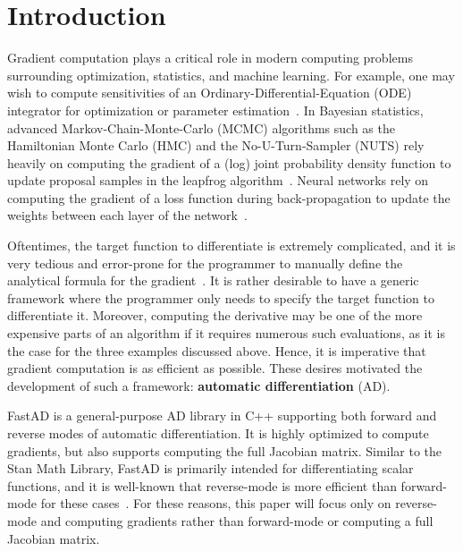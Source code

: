 \section{Introduction}

Gradient computation plays a critical role in modern computing problems 
surrounding optimization, statistics, and machine learning.
For example, one may wish to compute sensitivities of 
an Ordinary-Differential-Equation (ODE) integrator
for optimization or parameter estimation~\cite{carpenter:2015}.
In Bayesian statistics, advanced Markov-Chain-Monte-Carlo (MCMC) algorithms
such as the Hamiltonian Monte Carlo (HMC) and the No-U-Turn-Sampler (NUTS) rely
heavily on computing the gradient of a (log) joint probability density function
to update proposal samples in the leapfrog algorithm~\cite{hoffman:2011}\cite{neal:2012}.
Neural networks rely on computing 
the gradient of a loss function during back-propagation
to update the weights between each layer of the network~\cite{goodfellow:2016}.

Oftentimes, the target function to differentiate is extremely complicated,
and it is very tedious and error-prone for the programmer to manually define 
the analytical formula for the gradient~\cite{margossian:2018}.
It is rather desirable to have a generic framework where the programmer 
only needs to specify the target function to differentiate it.
Moreover, computing the derivative may be one of the more expensive parts of an algorithm
if it requires numerous such evaluations, as it is the case for the three examples discussed above.
Hence, it is imperative that gradient computation is as efficient as possible.
These desires motivated the development of such a framework: \textbf{automatic differentiation} (AD).

FastAD is a general-purpose AD library in C++ supporting both forward and reverse modes of automatic differentiation.
It is highly optimized to compute gradients, but also supports computing the full Jacobian matrix.
Similar to the Stan Math Library, FastAD is primarily intended for differentiating scalar functions, 
and it is well-known that reverse-mode is more efficient than forward-mode for these cases~\cite{carpenter:2015}.
For these reasons, this paper will focus only on reverse-mode and computing gradients 
rather than forward-mode or computing a full Jacobian matrix.

